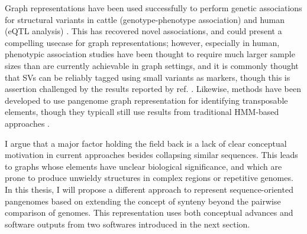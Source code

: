 Graph representations have been used successfully to perform genetic associations for structural variants in cattle (genotype-phenotype association) and human (eQTL analysis) \cite{milia25, wang26}.
This has recovered novel associations, and could present a compelling usecase for graph representations; however, especially in human, phenotypic association studies have been thought to require much larger sample sizes than are currently achievable in graph settings\cite{uffelmann21}, and it is commonly thought that SVs can be reliably tagged using small variants as markers, though this is assertion challenged by the results reported by ref. \cite{wang26}.
Likewise, methods have been developed to use pangenome graph representation for identifying transposable elements, though they typicall still use results from traditional HMM-based approaches \cite{igolkina25, sierra24, tempel12}.

I argue that a major factor holding the field back is a lack of clear conceptual motivation in current approaches besides collapsing similar sequences.
This leads to graphs whose elements have unclear biological significance, and which are prone to produce unwieldy structures in complex regions or repetitive genomes.
In this thesis, I will propose a different approach to represent sequence-oriented pangenomes based on extending the concept of synteny beyond the pairwise comparison of genomes.
This representation uses both conceptual advances and software outputs from two softwares introduced in the next section.






